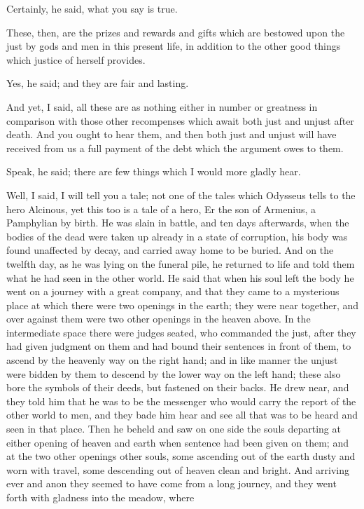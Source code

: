 Certainly, he said, what you say is true.

These, then, are the prizes and rewards and gifts which are bestowed
upon the just by gods and men in this present life, in addition to the
other good things which justice of herself provides.

Yes, he said; and they are fair and lasting.

And yet, I said, all these are as nothing either in number or greatness
in comparison with those other recompenses which await both just and
unjust after death. And you ought to hear them, and then both just and
unjust will have received from us a full payment of the debt which the
argument owes to them.

Speak, he said; there are few things which I would more gladly hear.

Well, I said, I will tell you a tale; not one of the tales which
Odysseus tells to the hero Alcinous, yet this too is a tale of a hero,
Er the son of Armenius, a Pamphylian by birth. He was slain in battle,
and ten days afterwards, when the bodies of the dead were taken up
already in a state of corruption, his body was found unaffected by
decay, and carried away home to be buried. And on the twelfth day, as he
was lying on the funeral pile, he returned to life and told them what he
had seen in the other world. He said that when his soul left the body
he went on a journey with a great company, and that they came to a
mysterious place at which there were two openings in the earth; they
were near together, and over against them were two other openings in the
heaven above. In the intermediate space there were judges seated, who
commanded the just, after they had given judgment on them and had bound
their sentences in front of them, to ascend by the heavenly way on the
right hand; and in like manner the unjust were bidden by them to descend
by the lower way on the left hand; these also bore the symbols of their
deeds, but fastened on their backs. He drew near, and they told him that
he was to be the messenger who would carry the report of the other world
to men, and they bade him hear and see all that was to be heard and seen
in that place. Then he beheld and saw on one side the souls departing at
either opening of heaven and earth when sentence had been given on them;
and at the two other openings other souls, some ascending out of the
earth dusty and worn with travel, some descending out of heaven clean
and bright. And arriving ever and anon they seemed to have come from a
long journey, and they went forth with gladness into the meadow, where
